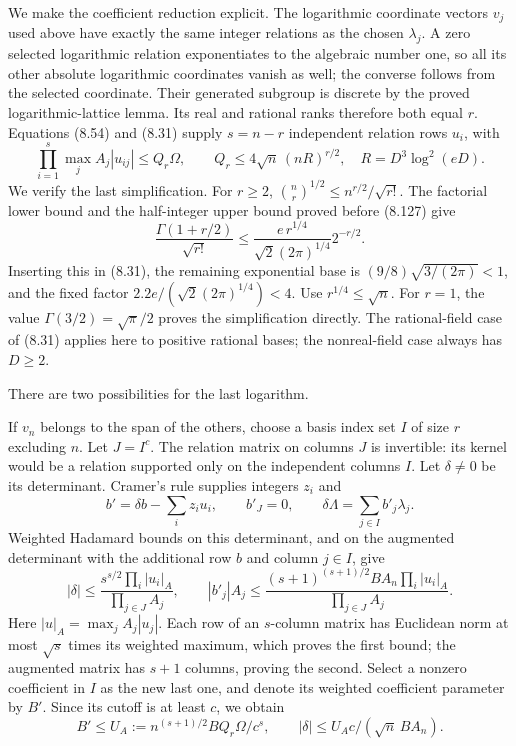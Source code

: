 \documentclass[
  11pt,
  a4paper,
]{article}
\begin{document}
We make the coefficient reduction explicit. The logarithmic coordinate
vectors \(v_j\) used above have exactly the same integer relations as
the chosen \(\lambda_j\). A zero selected logarithmic relation
exponentiates to the algebraic number one, so all its other absolute
logarithmic coordinates vanish as well; the converse follows from the
selected coordinate. Their generated subgroup is discrete by the proved
logarithmic-lattice lemma. Its real and rational ranks therefore both
equal \(r\). Equations (8.54) and (8.31) supply \(s=n-r\) independent
relation rows \(u_i\), with \[
\prod_{i=1}^{s}\max_j A_j|u_{ij}|
\le Q_r\Omega,\qquad
Q_r\le4\sqrt n\,(nR)^{r/2},\quad
R=D^3\log^2(eD).
\tag{8.134}
\] We verify the last simplification. For \(r\ge2\),
\(\binom nr^{1/2}\le n^{r/2}/\sqrt{r!}\). The factorial lower bound and
the half-integer upper bound proved before (8.127) give \[
\frac{\Gamma(1+r/2)}{\sqrt{r!}}
\le\frac{e\,r^{1/4}}{\sqrt2(2\pi)^{1/4}}2^{-r/2}.
\] Inserting this in (8.31), the remaining exponential base is
\((9/8)\sqrt{3/(2\pi)}<1\), and the fixed factor
\(2.2e/(\sqrt2(2\pi)^{1/4})<4\). Use \(r^{1/4}\le\sqrt n\). For \(r=1\),
the value \(\Gamma(3/2)=\sqrt\pi/2\) proves the simplification directly.
The rational-field case of (8.31) applies here to positive rational
bases; the nonreal-field case always has \(D\ge2\).

There are two possibilities for the last logarithm.

If \(v_n\) belongs to the span of the others, choose a basis index set
\(I\) of size \(r\) excluding \(n\). Let \(J=I^c\). The relation matrix
on columns \(J\) is invertible: its kernel would be a relation supported
only on the independent columns \(I\). Let \(\delta\ne0\) be its
determinant. Cramer's rule supplies integers \(z_i\) and \[
b'=\delta b-\sum_i z_iu_i,\qquad b'_J=0,\qquad
\delta\Lambda=\sum_{j\in I}b'_j\lambda_j.
\] Weighted Hadamard bounds on this determinant, and on the augmented
determinant with the additional row \(b\) and column \(j\in I\), give \[
|\delta|\le
\frac{s^{s/2}\prod_i|u_i|_A}{\prod_{j\in J}A_j},
\qquad
|b'_j|A_j\le
\frac{(s+1)^{(s+1)/2}BA_n\prod_i|u_i|_A}
{\prod_{j\in J}A_j}.
\] Here \(|u|_A=\max_j A_j|u_j|\). Each row of an \(s\)-column matrix
has Euclidean norm at most \(\sqrt s\) times its weighted maximum, which
proves the first bound; the augmented matrix has \(s+1\) columns,
proving the second. Select a nonzero coefficient in \(I\) as the new
last one, and denote its weighted coefficient parameter by \(B'\). Since
its cutoff is at least \(c\), we obtain \[
B'\le U_A:=n^{(s+1)/2}BQ_r\Omega/c^s,\qquad
|\delta|\le U_Ac/(\sqrt n\,BA_n).
\tag{8.135}
\]
\end{document}

